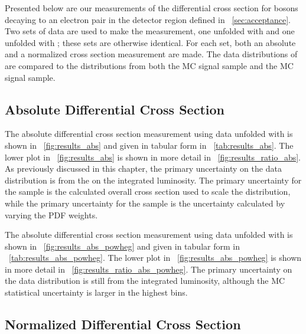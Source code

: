 Presented below are our measurements of the differential \phistar cross section
for \Z bosons decaying to an electron pair in the detector region defined in
\SEC~\ref{sec:acceptance}. Two sets of data are used to make the measurement,
one unfolded with \MADGRAPH and one unfolded with \POWHEG; these sets are
otherwise identical. For each set, both an absolute and a normalized cross
section measurement are made. The data distributions of \phistar are compared
to the distributions from both the \MADGRAPH MC signal sample and the \POWHEG
MC signal sample.

\subsection{Absolute Differential Cross Section}
\label{ssec:results_abs}

The absolute differential cross section measurement using data unfolded with
\MADGRAPH is shown in \FIG~\ref{fig:results_abs} and given in tabular form in
\TAB~\ref{tab:results_abs}. The lower plot in \FIG~\ref{fig:results_abs} is
shown in more detail in \FIG~\ref{fig:results_ratio_abs}. As previously
discussed in this chapter, the primary uncertainty on the data distribution is
from the on the integrated luminosity. The primary uncertainty for the
\MADGRAPH sample is the \FEWZ calculated overall cross section used to scale
the distribution, while the primary uncertainty for the \POWHEG sample is the
uncertainty calculated by varying the \CTten PDF weights.




The absolute differential cross section measurement using data unfolded with
\POWHEG is shown in \FIG~\ref{fig:results_abs_powheg} and given in tabular form
in \TAB~\ref{tab:results_abs_powheg}. The lower plot in
\FIG~\ref{fig:results_abs_powheg} is shown in more detail in
\FIG~\ref{fig:results_ratio_abs_powheg}. The primary uncertainty on the data
distribution is still from the integrated luminosity, although the MC
statistical uncertainty is larger in the highest \phistar bins.




\subsection{Normalized Differential Cross Section}
\label{ssec:results_norm}

